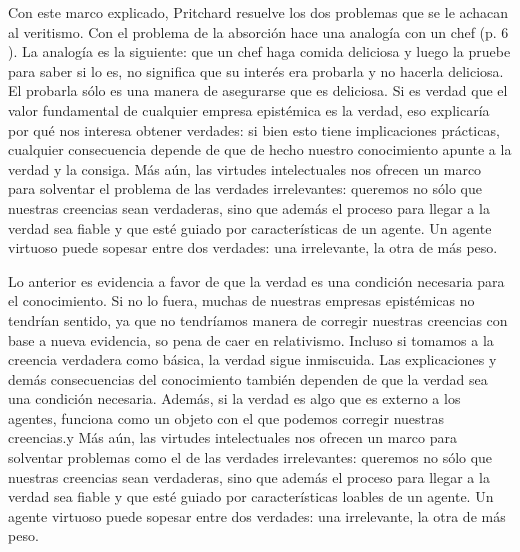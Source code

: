 \documentclass[12pt]{article}
\begin{document}
Con este marco explicado, Pritchard resuelve los dos problemas que se le achacan al veritismo. Con el problema de la absorción hace una analogía con un chef (p. 6 ). La analogía es la siguiente:  que un chef haga comida deliciosa y luego la pruebe para saber si lo es, no significa que su interés era probarla y no hacerla deliciosa. El probarla sólo es una manera de asegurarse que es deliciosa. Si es verdad que el valor fundamental de cualquier empresa epistémica es la verdad, eso explicaría por qué nos interesa obtener verdades: si bien esto tiene implicaciones prácticas, cualquier consecuencia depende de que de hecho nuestro conocimiento apunte a la verdad y la consiga. Más aún, las virtudes intelectuales nos ofrecen un marco para solventar el problema de las verdades irrelevantes: queremos no sólo que nuestras creencias sean verdaderas, sino que además el proceso para llegar a la verdad sea fiable y que esté guiado por características de un agente. Un agente virtuoso puede sopesar entre dos verdades: una irrelevante, la otra de más peso.


Lo anterior es evidencia a favor de que la verdad es una condición necesaria para el conocimiento. Si no lo fuera, muchas de nuestras empresas epistémicas no tendrían sentido, ya que no tendríamos manera de corregir nuestras creencias con base a nueva evidencia, so pena de caer en relativismo. Incluso si tomamos a la creencia verdadera como básica, la verdad sigue inmiscuida. Las explicaciones y demás consecuencias del conocimiento también dependen de que la verdad sea una condición necesaria. Además, si la verdad es algo que es externo a los agentes, funciona como un objeto con el que podemos corregir nuestras creencias.y Más aún, las virtudes intelectuales nos ofrecen un marco para solventar problemas como el de las verdades irrelevantes: queremos no sólo que nuestras creencias sean verdaderas, sino que además el proceso para llegar a la verdad sea fiable y que esté guiado por características loables de un agente. Un agente virtuoso puede sopesar entre dos verdades: una irrelevante, la otra de más peso.
\end{document}
